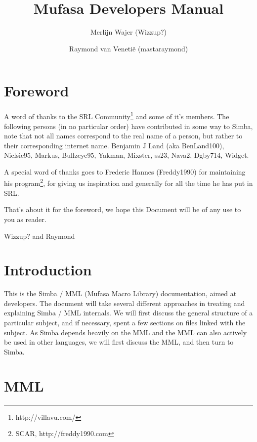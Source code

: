 \documentclass[a4paper, 10pt]{report} %
\begin{document}
\title{Mufasa Developers Manual}
\author{Merlijn Wajer (Wizzup?) \and Raymond van Veneti\"{e} (mastaraymond)}
\maketitle
\tableofcontents
% 

\chapter{Foreword}

A word of thanks to the SRL Community\footnote{http://villavu.com/} and some of
it's members.
The following persons (in no particular order) have contributed in some way to
Simba, note that not all names correspond to the real name of a person, but
rather to their corresponding internet name.
Benjamin J Land (aka BenLand100), Nielsie95, Markus, Bullzeye95,
Yakman, Mixster, ss23, Nava2, Dgby714, Widget.

A special word of thanks goes to Frederic Hannes (Freddy1990) for maintaining
his program\footnote{SCAR, http://freddy1990.com}, for giving us inspiration
and generally for all the time he has put in SRL.

That's about it for the foreword, we hope this Document will be of any use to
you as reader.

Wizzup? and Raymond

\chapter{Introduction}

This is the Simba / MML (Mufasa Macro Library) documentation, aimed at
developers. The document will take several different approaches in treating and
explaining Simba / MML internals. We will first discuss the general 
structure of a particular subject, and if necessary, spent a few sections
on files linked with the subject. 
As Simba depends heavily on the MML and the MML can also actively be used in 
other languages, we will first discuss the MML, and then turn to Simba.

\chapter{MML}
\end{document}
